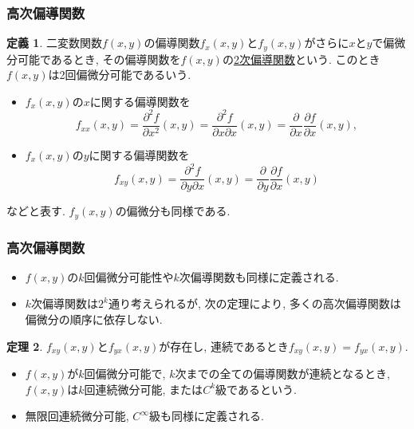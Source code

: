 \documentclass[dvipdfmx,cjk,10.2pt]{beamer}
\theoremstyle{definition}
\newtheorem{Thm}{定理}[section]
\newtheorem{Def}[Thm]{定義}
\begin{document}


\begin{frame}
\frametitle{高次偏導関数}

\begin{Def}
二変数関数$f(x,y)$の偏導関数$f_x(x,y)$と$f_y(x,y)$がさらに$x$と$y$で偏微分可能であるとき, その偏導関数を$f(x,y)$の\underline{2次偏導関数}という. 
このとき$f(x,y)$は2回偏微分可能であるいう. 
\begin{itemize}
\item $f_x(x,y)$の$x$に関する偏導関数を
$$
f_{xx}(x,y)=\frac{\partial^2 f}{\partial x^2}(x,y)=\frac{\partial^2 f}{\partial x \partial x}(x,y)=\frac{\partial }{\partial x}\frac{\partial f}{\partial x}(x,y), 
$$
\item $f_x(x,y)$の$y$に関する偏導関数を
$$
f_{xy}(x,y)=\frac{\partial^2 f}{\partial y \partial x}(x,y)=\frac{\partial }{\partial y}\frac{\partial f}{\partial x}(x,y)
$$
\end{itemize}
などと表す. $f_y(x,y)$の偏微分も同様である. 
\end{Def}

\end{frame}





\begin{frame}
\frametitle{高次偏導関数}

\begin{itemize}
\item $f(x,y)$の$k$回偏微分可能性や$k$次偏導関数も同様に定義される. 
\item $k$次偏導関数は$2^k$通り考えられるが, 次の定理により, 多くの高次偏導関数は偏微分の順序に依存しない.  
\end{itemize}

\begin{Thm}
$f_{xy}(x,y)$と$f_{yx}(x,y)$が存在し, 連続であるとき$f_{xy}(x,y)=f_{yx}(x,y)$. 
\end{Thm}

\begin{itemize}
\item $f(x,y)$が$k$回偏微分可能で, $k$次までの全ての偏導関数が連続となるとき, $f(x,y)$は$k$回連続微分可能, または$C^k$級であるという. 
\item 無限回連続微分可能, $C^\infty$級も同様に定義される.
\end{itemize}
\end{frame}
\end{document}
